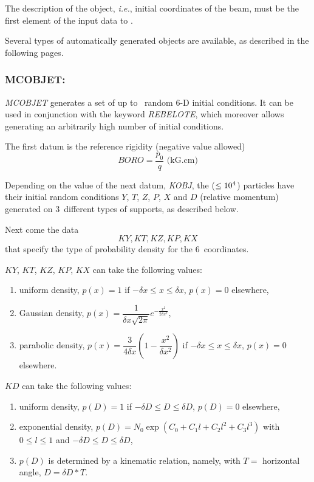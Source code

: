 The description of the object, \emph{i.e.}, initial coordinates of the 
beam, must be the first element of the input data to \zgou. 
 \bigskip

\noindent Several types of automatically generated objects are available, 
as described in the following pages.

\newpage

\subsubsection*{MCOBJET:  \MCOBJETTitl} \label{MCOBJET} 

\noindent \textsl{MCOBJET} generates a set of up to \imax\ random 6-D initial
conditions. It can be used in conjunction with the keyword \textsl{REBELOTE},
which  moreover allows generating an arbitrarily high number of initial conditions. 
 \bigskip

\noindent The first datum is the reference rigidity (negative value 
allowed)
$$ BORO = \dfrac{p_0 }{ q} \text{ (kG.cm)} $$

\noindent Depending on the value of the next datum, \textsl{KOBJ}, the 
\IMAX{} ($\leq 10^4$) particles have their initial random 
conditions $ Y$, $T$, $Z$, $P$, $X$ and $ D $ (relative momentum)  generated 
on 3~different types of supports, as described below. 

\noindent Next come the data
$$KY, KT, KZ, KP, KX$$  %
that specify the type of probability density for the 6~coordinates. 

\noindent $KY$, $KT$, $KZ$, $KP$, $KX$ can take the following values:
\begin{enumerate}
\item uniform density, $p(x) =1$ if  $-\delta x \leq x \leq \delta x$, $p(x) = 0$ elsewhere,
\item Gaussian density, $p(x) = \dfrac{1}{\delta x \sqrt{2\pi}} 
	e^{- \frac{x^2}{2 \delta x^2}}$,
\item parabolic density, $p(x) = \dfrac{3}{4 \delta x} 
	(1- \dfrac{x^2}{\delta x^2})$ if $-\delta x \leq x \leq \delta x$, $p(x) = 0$ elsewhere.
\end{enumerate}

\noindent $KD$ can take the following values:
\begin{enumerate}
\item uniform density, $p(D) =1$ if  $-\delta D \leq D \leq \delta D$, $p(D) = 0$ elsewhere,
\item exponential density, $p(D) = N_0 \exp (C_0 + C_1 l + C_2 l^2 + C_3 l^3)$
	with $0 \leq l \leq 1$ and $-\delta D \leq D \leq \delta D$,
\item $p(D)$ is determined by a kinematic relation, namely, with $T=$ 
horizontal angle, $D= \delta D \ast T$.
\end{enumerate}

